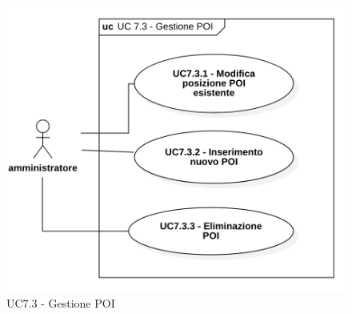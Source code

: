 \begin{figure}[H]

 \centering

 \includegraphics[scale=0.52]{res/images/uc7-3.png}

 \caption{UC7.3 - Gestione POI}

\end{figure}



